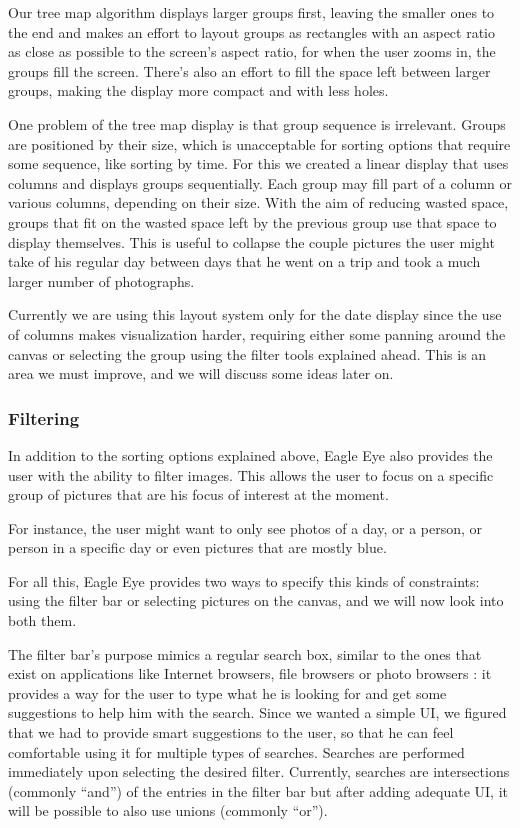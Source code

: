 Our tree map algorithm displays larger groups first, leaving the smaller ones to the end and makes an effort to layout groups as rectangles with an aspect ratio as close as possible to the screen's aspect ratio, for when the user zooms in, the groups fill the screen. There's also an effort to fill the space left between larger groups, making the display more compact and with less holes.

One problem of the tree map display is that group sequence is irrelevant. Groups are positioned by their size, which is unacceptable for sorting options that require some sequence, like sorting by time. For this we created a linear display that uses columns and displays groups sequentially. Each group may fill part of a column or various columns, depending on their size. With the aim of reducing wasted space, groups that fit on the wasted space left by the previous group use that space to display themselves. This is useful  to collapse the couple pictures the user might take of his regular day between days that he went on a trip and took a much larger number of photographs.

Currently we are using this layout system only for the date display since the use of columns makes visualization harder, requiring either some panning around the canvas or selecting the group using the filter tools explained ahead. This is an area we must improve, and we will discuss some ideas later on.


\subsubsection{Filtering} %

In addition to the sorting options explained above, Eagle Eye also provides the user with the ability to filter images. This allows the user to focus on a specific group of pictures that are his focus of interest at the moment.

For instance, the user might want to only see photos of a day, or a person, or person in a specific day or even pictures that are mostly blue.

For all this, Eagle Eye provides two ways to specify this kinds of constraints: using the filter bar or selecting pictures on the canvas, and we will now look into both them.

The filter bar's purpose mimics a regular search box, similar to the ones that exist on applications like Internet browsers, file browsers or photo browsers : it provides a way for the user to type what he is looking for and get some suggestions to help him with the search. Since we wanted a simple \ac{UI}, we figured that we had to provide smart suggestions to the user, so that he can feel comfortable using it for multiple types of searches. Searches are performed immediately upon selecting the desired filter. Currently, searches are intersections (commonly ``and'') of the entries in the filter bar but after adding adequate \ac{UI}, it will be possible to also use unions (commonly ``or'').

